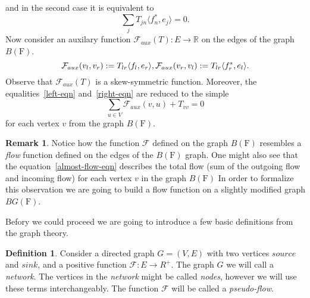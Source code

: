 \documentclass[12pt]{article}
\renewcommand{\cal}[1]{\mathcal{#1}}
\theoremstyle{definition}
\newtheorem{remark}{Remark}
\newtheorem{definition}{Definition}
\newcommand{\fsys}{\mathrm{F}}
\numberwithin{remark}{section}
\numberwithin{theorem}{section}
\numberwithin{prop}{section}
\numberwithin{equation}{section}
\numberwithin{lemma}{section}
\numberwithin{prop_under_lemma}{lemma}
\begin{document}
    and in the second case it is equivalent to 
    \begin{equation}
        \label{right-eqn}
        \sum_j T_{jn} \langle f^*_n, e_j \rangle = 0.
    \end{equation}
    Now consider an auxilary function $\cal{F}_{aux}(T): E \to \mathbb{R}$ 
    on the edges of the graph $B(\fsys)$.
    \begin{equation*}
        \cal{F}_{aux}(v_l, v_r) := T_{lr} \langle f_l, e_r \rangle,\\
        \cal{F}_{aux}(v_r, v_l) := T_{lr} \langle f^*_r, e_l \rangle.
    \end{equation*}
    Observe that $\cal{F}_{aux}(T)$ is a skew-symmetric function.
    Moreover, the equalities~\eqref{left-eqn} and~\eqref{right-eqn} are reduced to the simple
    \begin{equation}
      \label{almost-flow-eqn}
      \sum_{u \in V} \cal{F}_{aux}(v, u) + T_{vv} = 0
    \end{equation}
    for each vertex $v$ from the graph $B(\fsys)$.
    \begin{remark}
      Notice how the function $\cal{F}$ defined on the graph $B(\fsys)$ resembles
      a \emph{flow} function defined on the edges of the $B(\fsys)$ graph.
      One might also see that the equation~\eqref{almost-flow-eqn} describes the total flow (sum of the outgoing flow and incoming flow) 
      for each vertex $v$ in the graph $B(\fsys)$
      In order to formalize this observation we are going to build a flow function
      on a slightly modified graph $BG(\fsys)$.
    \end{remark}
    Befory we could proceed we are going to introduce a few basic definitions from the graph theory.
    \begin{definition}
        Consider a directed graph $G = (V, E)$ with two vertices $\mathit{source}$ and
        $\mathit{sink}$, and a positive function $\cal{F}: E\to R^{+}$.
        The graph $G$ we will call a \textit{network}.
        The vertices in the \textit{network} might be called \textit{nodes}, however we will use these terms interchangeably.
        The function $\cal{F}$ will be called a \textit{pseudo-flow}.
    \end{definition}
\end{document}
